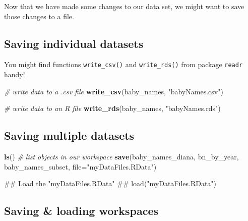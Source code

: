 \documentclass[]{book}
\newenvironment{Shaded}{\begin{snugshade}}{\end{snugshade}}
\newcommand{\KeywordTok}[1]{\textcolor[rgb]{0.13,0.29,0.53}{\textbf{#1}}}
\newcommand{\DataTypeTok}[1]{\textcolor[rgb]{0.13,0.29,0.53}{#1}}
\newcommand{\StringTok}[1]{\textcolor[rgb]{0.31,0.60,0.02}{#1}}
\newcommand{\CommentTok}[1]{\textcolor[rgb]{0.56,0.35,0.01}{\textit{#1}}}
\newcommand{\NormalTok}[1]{#1}
\begin{document}
Now that we have made some changes to our data set, we might want to
save those changes to a file.

\subsection{Saving individual
datasets}\label{saving-individual-datasets}

You might find functions \texttt{write\_csv()} and \texttt{write\_rds()}
from package \texttt{readr} handy!

\begin{Shaded}
\begin{Highlighting}[]
\CommentTok{# write data to a .csv file}
\KeywordTok{write_csv}\NormalTok{(baby_names, }\StringTok{"babyNames.csv"}\NormalTok{)}
\end{Highlighting}
\end{Shaded}

\begin{Shaded}
\begin{Highlighting}[]
\CommentTok{# write data to an R file}
\KeywordTok{write_rds}\NormalTok{(baby_names, }\StringTok{"babyNames.rds"}\NormalTok{)}
\end{Highlighting}
\end{Shaded}

\subsection{Saving multiple datasets}\label{saving-multiple-datasets}

\begin{Shaded}
\begin{Highlighting}[]
\KeywordTok{ls}\NormalTok{() }\CommentTok{# list objects in our workspace}
\KeywordTok{save}\NormalTok{(baby_names_diana, bn_by_year, baby_names_subset, }\DataTypeTok{file=}\StringTok{"myDataFiles.RData"}\NormalTok{)  }
\end{Highlighting}
\end{Shaded}

\begin{Shaded}
\begin{Highlighting}[]
\NormalTok{## Load the "myDataFiles.RData"}
\NormalTok{## load("myDataFiles.RData") }
\end{Highlighting}
\end{Shaded}

\subsection{Saving \& loading
workspaces}\label{saving-loading-workspaces}
\end{document}
